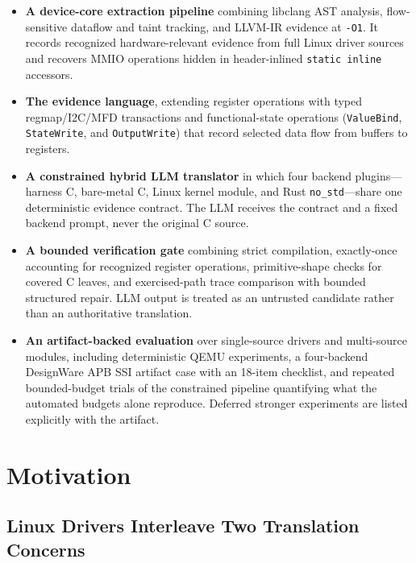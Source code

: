 \begin{itemize}
\item \textbf{A device-core extraction pipeline} combining libclang AST analysis, flow-sensitive dataflow and taint tracking, and LLVM-IR evidence at \texttt{-O1}. It records recognized hardware-relevant evidence from full Linux driver sources and recovers MMIO operations hidden in header-inlined \texttt{static~inline} accessors.

\item \textbf{The \rislang{} evidence language}, extending register operations with typed regmap/I2C/MFD transactions and functional-state operations (\texttt{ValueBind}, \texttt{StateWrite}, and \texttt{OutputWrite}) that record selected data flow from buffers to registers.

\item \textbf{A constrained hybrid LLM translator} in which four backend plugins---harness C, bare-metal C, Linux kernel module, and Rust \texttt{no\_std}---share one deterministic evidence contract. The LLM receives the contract and a fixed backend prompt, never the original C source.

\item \textbf{A bounded verification gate} combining strict compilation, exactly-once accounting for recognized register operations, primitive-shape checks for covered C leaves, and exercised-path trace comparison with bounded structured repair. LLM output is treated as an untrusted candidate rather than an authoritative translation.

\item \textbf{An artifact-backed evaluation} over \EvalDrivers{} single-source drivers and \MultiSourceDrivers{} multi-source modules, including deterministic QEMU experiments, a four-backend DesignWare APB SSI artifact case with an 18-item checklist, and repeated bounded-budget trials of the constrained pipeline quantifying what the automated budgets alone reproduce. Deferred stronger experiments are listed explicitly with the artifact.
\end{itemize}

\section{Motivation}
\label{sec:motivation}

\subsection{Linux Drivers Interleave Two Translation Concerns}

